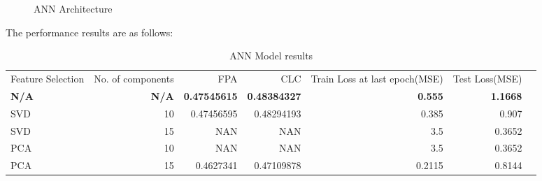 \begin{figure}
%
  \caption{ANN Architecture}
  \label{fig:key}
\end{figure}
 
 The performance results are as follows:
 
\begin{table}[!htp]\centering
\caption{ANN Model results}\label{tab: }
\scriptsize
\begin{tabular}{lrrrrrr}\toprule
Feature Selection &No. of components &FPA &CLC &Train Loss at last epoch(MSE) &Test Loss(MSE) \\
\textbf{N/A} &\textbf{N/A} &\textbf{0.47545615} &\textbf{0.48384327} &\textbf{0.555} &\textbf{1.1668} \\\midrule
SVD &10 &0.47456595 &0.48294193 &0.385 &0.907 \\
SVD &15 &NAN &NAN &3.5 &0.3652 \\
PCA &10 &NAN &NAN &3.5 &0.3652 \\
PCA &15 &0.4627341 &0.47109878 &0.2115 &0.8144 \\
\bottomrule
\end{tabular}
\end{table}
 
